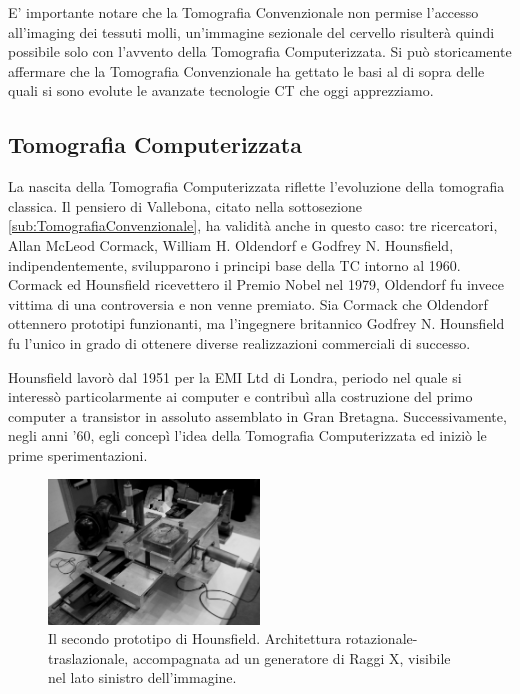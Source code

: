 \documentclass[a4paper,12pt, doubleside]{report}
\begin{document}
                \bigskip
                \par
                    E’ importante notare che la Tomografia Convenzionale non permise l’accesso all’imaging dei tessuti molli, un’immagine sezionale del cervello risulterà quindi possibile solo con l’avvento della Tomografia Computerizzata. Si può storicamente affermare che la Tomografia Convenzionale ha gettato le basi al di sopra delle quali si sono evolute le avanzate tecnologie CT che oggi apprezziamo.
                        
            \subsection{Tomografia Computerizzata}
                \par      
                    La nascita della Tomografia Computerizzata riflette l'evoluzione della tomografia classica. Il pensiero di Vallebona, citato nella sottosezione \ref{sub:TomografiaConvenzionale}, ha validità anche in questo caso: tre ricercatori, Allan McLeod Cormack, William H. Oldendorf e Godfrey N. Hounsfield, indipendentemente, svilupparono i principi base della TC intorno al 1960. Cormack ed Hounsfield ricevettero il Premio Nobel nel 1979, Oldendorf fu invece vittima di una controversia\cite{nobel-debate} e non venne premiato. 
                    Sia Cormack che Oldendorf ottennero prototipi funzionanti, ma l'ingegnere britannico Godfrey N. Hounsfield fu l'unico in grado di ottenere diverse realizzazioni commerciali di successo.
                
                \bigskip
                \par
                    Hounsfield lavorò dal 1951 per la EMI Ltd di Londra, periodo nel quale si interessò particolarmente ai computer e contribuì alla costruzione del primo computer a transistor in assoluto assemblato in Gran Bretagna\cite{hounsfield-autobiografia}. Successivamente, negli anni '60, egli concepì l’idea della Tomografia Computerizzata ed iniziò le prime sperimentazioni.
                            
                    \begin{figure}[h]
                        \centering
                        \includegraphics[width=0.5\textwidth]{hounsfield_prototype2}
                        \caption{Il secondo prototipo di Hounsfield. Architettura rotazionale-traslazionale, accompagnata ad un generatore di Raggi X, visibile nel lato sinistro dell'immagine.}
                        \label{fig:second-prototype}
                    \end{figure}
                            
\end{document}

